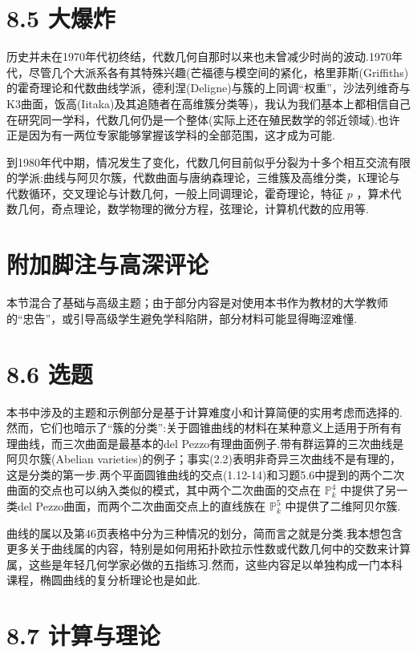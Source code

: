 \section{8.5 大爆炸}

历史并未在1970年代初终结，代数几何自那时以来也未曾减少时尚的波动.1970年代，尽管几个大派系各有其特殊兴趣(芒福德与模空间的紧化，格里菲斯(Griffiths)的霍奇理论和代数曲线学派，德利涅(Deligne)与簇的上同调“权重”，沙法列维奇与K3曲面，饭高(Iitaka)及其追随者在高维簇分类等)，我认为我们基本上都相信自己在研究同一学科，代数几何仍是一个整体(实际上还在殖民数学的邻近领域).也许正是因为有一两位专家能够掌握该学科的全部范围，这才成为可能.

到1980年代中期，情况发生了变化，代数几何目前似乎分裂为十多个相互交流有限的学派:曲线与阿贝尔簇，代数曲面与唐纳森理论，三维簇及高维分类，K理论与代数循环，交叉理论与计数几何，一般上同调理论，霍奇理论，特征 \(p\) ，算术代数几何，奇点理论，数学物理的微分方程，弦理论，计算机代数的应用等.

\section{附加脚注与高深评论}

本节混合了基础与高级主题；由于部分内容是对使用本书作为教材的大学教师的“忠告”，或引导高级学生避免学科陷阱，部分材料可能显得晦涩难懂.

\section{8.6 选题}

本书中涉及的主题和示例部分是基于计算难度小和计算简便的实用考虑而选择的.然而，它们也暗示了“簇的分类”:关于圆锥曲线的材料在某种意义上适用于所有有理曲线，而三次曲面是最基本的del Pezzo有理曲面例子.带有群运算的三次曲线是阿贝尔簇(Abelian varieties)的例子；事实(2.2)表明非奇异三次曲线不是有理的，这是分类的第一步.两个平面圆锥曲线的交点(1.12-14)和习题5.6中提到的两个二次曲面的交点也可以纳入类似的模式，其中两个二次曲面的交点在 \({\mathbb{P}}_{k}^{4}\) 中提供了另一类del Pezzo曲面，而两个二次曲面交点上的直线族在 \({\mathbb{P}}_{k}^{5}\) 中提供了二维阿贝尔簇.

曲线的属以及第46页表格中分为三种情况的划分，简而言之就是分类.我本想包含更多关于曲线属的内容，特别是如何用拓扑欧拉示性数或代数几何中的交数来计算属，这些是年轻几何学家必做的五指练习.然而，这些内容足以单独构成一门本科课程，椭圆曲线的复分析理论也是如此.

\section{8.7 计算与理论}

